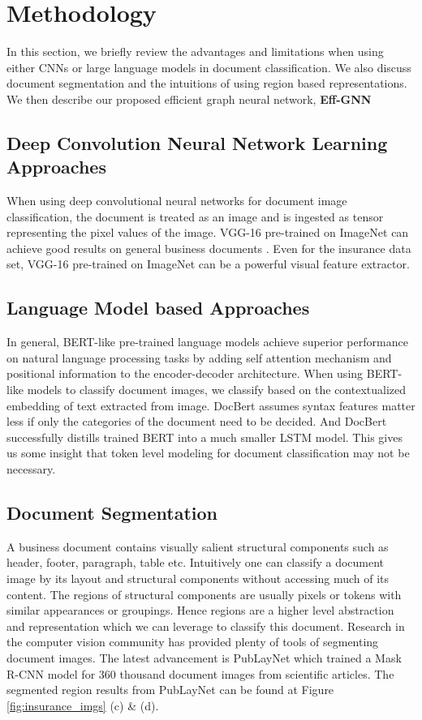 \documentclass[letterpaper]{article}
\begin{document}
 
\section{Methodology}


In this section, we briefly review the advantages and limitations when using either CNNs or large language models in document classification. We also discuss document segmentation and the intuitions of using region based representations. We then describe our proposed efficient graph neural network, \textbf{Eff-GNN}  
\subsection{Deep Convolution Neural Network Learning Approaches}
When using deep convolutional neural networks for document image classification, the document is treated as an image and is ingested as tensor representing the pixel values of the image. VGG-16 pre-trained on ImageNet \cite{DengDSLL009} can achieve good results on general business documents \cite{DCGNN}. Even for the insurance data set, VGG-16 pre-trained on ImageNet can be a powerful visual feature extractor. 




\subsection{Language Model based Approaches}
In general, BERT-like pre-trained language models achieve superior performance on natural language processing tasks by adding self attention mechanism and positional information to the encoder-decoder architecture. When using BERT-like models to classify document images, we classify based on the contextualized embedding of text extracted from image. DocBert \cite{DOCBERT} assumes syntax features matter less if only the categories of the document need to be decided. And DocBert successfully distills trained BERT into a much smaller LSTM model. This gives us some insight that token level modeling for document classification may not be necessary.   

\subsection{Document Segmentation}
A business document contains visually salient structural components such as header, footer, paragraph, table etc. Intuitively one can classify a document image by its layout and structural components without accessing much of its content. The regions of structural components are usually pixels or tokens with similar appearances or groupings. Hence regions are a higher level abstraction and representation which we can leverage to classify this document. Research in the computer vision community has provided plenty of tools of segmenting document images. The latest advancement is PubLayNet which trained a Mask R-CNN model for 360 thousand document images from scientific articles. The segmented region results from PubLayNet can be found at Figure 
\ref{fig:insurance_imgs} (c) \& (d). 
\end{document}
